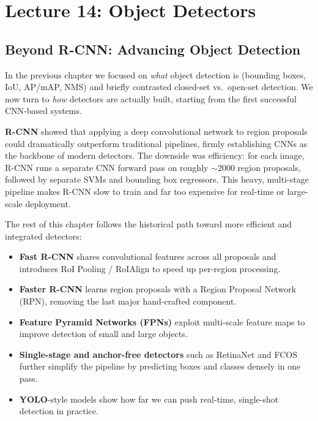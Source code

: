 
\chapter{Lecture 14: Object Detectors}


\section{Beyond R-CNN: Advancing Object Detection}
\label{sec:chapter14_intro}

In the previous chapter we focused on \emph{what} object detection is (bounding boxes, IoU, AP/mAP, NMS) and briefly contrasted closed-set vs.\ open-set detection. We now turn to \emph{how} detectors are actually built, starting from the first successful CNN-based systems.

\textbf{R-CNN} showed that applying a deep convolutional network to region proposals could dramatically outperform traditional pipelines, firmly establishing CNNs as the backbone of modern detectors. The downside was efficiency: for each image, R-CNN runs a separate CNN forward pass on roughly \(\sim 2000\) region proposals, followed by separate SVMs and bounding box regressors. This heavy, multi-stage pipeline makes R-CNN slow to train and far too expensive for real-time or large-scale deployment.

The rest of this chapter follows the historical path toward more efficient and integrated detectors:

\begin{itemize}
	\item \textbf{Fast R-CNN} shares convolutional features across all proposals and introduces RoI Pooling / RoIAlign to speed up per-region processing.
	\item \textbf{Faster R-CNN} learns region proposals with a Region Proposal Network (RPN), removing the last major hand-crafted component.
	\item \textbf{Feature Pyramid Networks (FPNs)} exploit multi-scale feature maps to improve detection of small and large objects.
	\item \textbf{Single-stage and anchor-free detectors} such as RetinaNet and FCOS further simplify the pipeline by predicting boxes and classes densely in one pass.
	\item \textbf{YOLO}-style models show how far we can push real-time, single-shot detection in practice.
\end{itemize}

